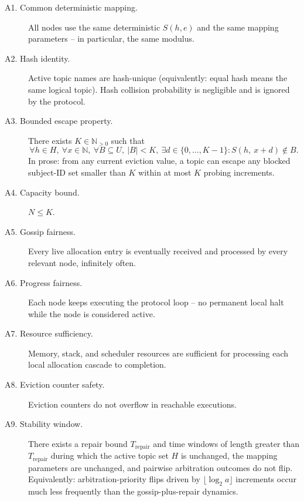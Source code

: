 \begin{description}
    \item[A1. Common deterministic mapping.] All nodes use the same
    deterministic $S(h, e)$ and the same mapping parameters -- in particular,
    the same modulus.

    \item[A2. Hash identity.] Active topic names are hash-unique
    (equivalently: equal hash means the same logical topic).
    Hash collision probability is negligible and is ignored by the protocol.

    \item[A3. Bounded escape property.] There exists $K \in \mathbb{N}_{>0}$
    such that
    \[
        \forall h \in H,\ \forall x \in \mathbb{N},\ \forall B \subseteq U,\
        |B| < K,\ \exists d \in \{0, \dots, K-1\} :
        S(h,\ x + d) \notin B.
    \]
    In prose: from any current eviction value, a topic can escape any
    blocked subject-ID set smaller than $K$ within at most $K$ probing
    increments.

    \item[A4. Capacity bound.] $N \le K$.

    \item[A5. Gossip fairness.] Every live allocation entry is eventually
    received and processed by every relevant node, infinitely often.

    \item[A6. Progress fairness.] Each node keeps executing the protocol
    loop -- no permanent local halt while the node is considered active.

    \item[A7. Resource sufficiency.] Memory, stack, and scheduler resources
    are sufficient for processing each local allocation cascade to
    completion.

    \item[A8. Eviction counter safety.] Eviction counters do not overflow
    in reachable executions.

    \item[A9. Stability window.] There exists a repair bound
    $T_{\mathrm{repair}}$ and time windows of length greater than
    $T_{\mathrm{repair}}$ during which the active topic set $H$ is
    unchanged, the mapping parameters are unchanged, and pairwise
    arbitration outcomes do not flip. Equivalently: arbitration-priority
    flips driven by $\lfloor \log_2 a \rfloor$ increments occur much less
    frequently than the gossip-plus-repair dynamics.
\end{description}

